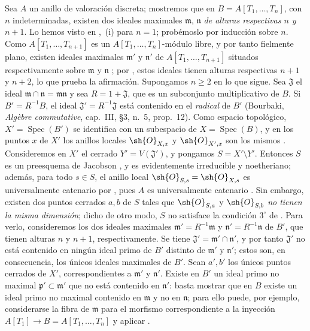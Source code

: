 \begin{env}[10.7.3]
\label{IV.10.7.3}
Sea $A$ un anillo de valoración discreta; mostremos que en $B=A[T_1,\ldots,T_n]$, con $n$ indeterminadas, existen dos ideales maximales $\mathfrak{m}$, $\mathfrak{n}$ \emph{de alturas respectivas $n$ y} $n+1$.
Lo hemos visto en ,~(i) para $n=1$; probémoslo por inducción sobre $n$.
Como $A[T_1,\ldots,T_{n+1}]$ es un $A[T_1,\ldots,T_n]$-módulo libre, y por tanto fielmente plano, existen ideales maximales $\mathfrak{m}'$ y $\mathfrak{n}'$ de $A[T_1,\ldots,T_{n+1}]$ situados respectivamente sobre $\mathfrak{m}$ y $\mathfrak{n}$ ; por , estos ideales tienen alturas respectivas $n+1$ y $n+2$, lo que prueba la afirmación.
Supongamos $n\geq 2$ en lo que sigue.
Sea $\mathfrak{J}$ el ideal $\mathfrak{m}\cap\mathfrak{n}=\mathfrak{m}\mathfrak{n}$ y sea $R=1+\mathfrak{J}$, que es un subconjunto multiplicativo de $B$.
Si $B'=R^{-1}B$, el ideal $\mathfrak{J}'=R^{-1}\mathfrak{J}$ está contenido en el \emph{radical} de $B'$ (Bourbaki, \emph{Alg\`ebre commutative}, cap.~III, \S3, n.~5, prop.~12).
Como espacio topológico, $X'=\operatorname{Spec}(B')$ se identifica con un subespacio de $X=\operatorname{Spec}(B)$, y en los puntos $x$ de $X'$ los anillos locales $\sh{O}_{X,x}$ y $\sh{O}_{X',x}$ son los mismos .
Consideremos en $X'$ el cerrado $Y'=V(\mathfrak{J}')$, y pongamos $S=X'\setminus Y'$.
Entonces $S$ es un preesquema de Jacobson , y es evidentemente irreducible y noetheriano; además, para todo $s\in S$, el anillo local $\sh{O}_{S,s}=\sh{O}_{X,s}$ es universalmente catenario por , pues $A$ es universalmente catenario .
Sin embargo, existen dos puntos cerrados $a,b$ de $S$ tales que $\sh{O}_{S,a}$ y $\sh{O}_{S,b}$ \emph{no tienen la misma dimensión}; dicho de otro modo, $S$ no satisface la condición $3^\circ$ de .
Para verlo, consideremos los dos ideales maximales $\mathfrak{m}'=R^{-1}\mathfrak{m}$ y $\mathfrak{n}'=R^{-1}\mathfrak{n}$ de $B'$, que tienen alturas $n$ y $n+1$, respectivamente.
Se tiene $\mathfrak{J}'=\mathfrak{m}'\cap\mathfrak{n}'$, y por tanto $\mathfrak{J}'$ no está contenido en ningún ideal primo de $B'$ distinto de $\mathfrak{m}'$ y $\mathfrak{n}'$; estos son, en consecuencia, los únicos ideales maximales de $B'$.
Sean $a',b'$ los únicos puntos cerrados de $X'$, correspondientes a $\mathfrak{m}'$ y $\mathfrak{n}'$.
Existe en $B'$ un ideal primo no maximal $\mathfrak{p}'\subset\mathfrak{m}'$ que no está contenido en $\mathfrak{n}'$: basta mostrar que en $B$ existe un ideal primo no maximal contenido en $\mathfrak{m}$ y no en $\mathfrak{n}$; para ello puede, por ejemplo, considerarse la fibra de $\mathfrak{m}$ para el morfismo correspondiente a la inyección $A[T_1]\longrightarrow B=A[T_1,\ldots,T_n]$ y aplicar .

\end{env}
